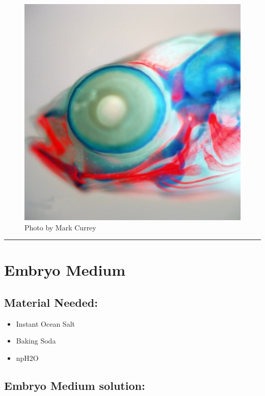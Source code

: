 \documentclass[
]{book}
\providecommand{\tightlist}{%
  \setlength{\itemsep}{0pt}\setlength{\parskip}{0pt}}
\begin{document}
\begin{figure}
\centering
\includegraphics{images/double_head.jpg}
\caption{Photo by Mark Currey}
\end{figure}

\begin{center}\rule{0.5\linewidth}{0.5pt}\end{center}

\hypertarget{embryo-medium}{%
\section{Embryo Medium}\label{embryo-medium}}

\hypertarget{material-needed}{%
\subsection{Material Needed:}\label{material-needed}}

\begin{itemize}
\tightlist
\item
  Instant Ocean Salt
\item
  Baking Soda
\item
  npH2O
\end{itemize}

\hypertarget{embryo-medium-solution}{%
\subsection{Embryo Medium solution:}\label{embryo-medium-solution}}
\end{document}
